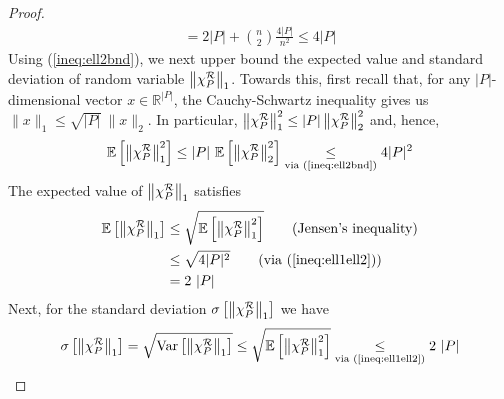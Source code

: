 \begin{proof}
\begin{align}
    =  2|P|+\binom{n}{2} \frac{4|P|}{n^2} 
    \leq 4|P| \label{ineq:ell2bnd}
    \end{align}
Using (\ref{ineq:ell2bnd}), we next upper bound the expected value and standard deviation of random variable $\left\|\chi^{\mathcal{R}}_P\right\|_1$. Towards this, first recall that, for any $|P|$-dimensional vector $x \in \mathbb{R}^{|P|}$, the Cauchy-Schwartz inequality gives us $\|x \|_1 \leq \sqrt{|P|} \  \| x \|_2$. In particular, $\left\|\chi^{\mathcal{R}}_P\right\|_1^2 \leq |P| \left\|\chi^{\mathcal{R}}_P\right\|_2^2$ and, hence, 
    \begin{align}
        \expval{\left\|\chi^\calR_P\right\|_1^2} \leq |P| \ \expval{\left\|\chi^\calR_P\right\|_2^2} \underset{\text{via (\ref{ineq:ell2bnd})}}{\leq} 4 |P|^2 \label{ineq:ell1ell2}
    \end{align}
The expected value of $\left\|\chi^{\mathcal{R}}_P\right\|_1$ satisfies 
\begin{align}
\expval{\ellone{\chi^\calR_P}} &\leq \sqrt{\expval{\ellone{\chi^\calR_P}^2}} \tag{Jensen's inequality} \\
& \leq \sqrt{ 4 |P|^2 } \tag{via (\ref{ineq:ell1ell2})} \\
& = 2 \ |P| \label{ineq:ell1bound}
\end{align}
       Next, for the standard deviation $\sigma\left[\left\|\chi^{\mathcal{R}}_P\right\|_1 \right]$ we have 
    \begin{align}
        \sigma\left[ \left\|\chi^{\mathcal{R}}_P\right\|_1 \right]
    =\sqrt{ \mathrm{Var} \left[ \left\|\chi^{\mathcal{R}}_P\right\|_1 \right]}
    \leq \sqrt{\mathbb{E}\left[\left\|\chi^{\mathcal{R}}_P\right\|_1^2\right]} \underset{\text{via (\ref{ineq:ell1ell2})}}{\leq} 2\ |P| \label{ineq:stddev}
    \end{align}


\end{proof}
